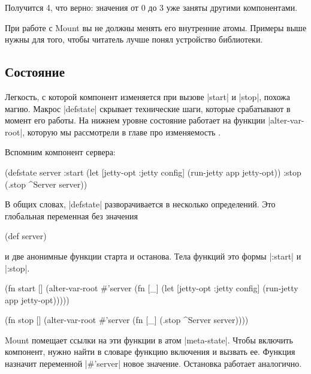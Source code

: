 Получится 4, что верно: значения от 0 до 3 уже заняты другими компонентами.

При работе с Mount вы не должны менять его внутренние атомы. Примеры
выше нужны для того, чтобы читатель лучше понял устройство библиотеки.

\subsection{Состояние}

Легкость, с которой компонент изменяется при вызове \spverb|start| и
\spverb|stop|, похожа магию. Макрос \spverb|defstate| скрывает технические шаги,
которые срабатывают в момент его работы. На нижнем уровне состояние работает на
функции \spverb|alter-var-root|, которую мы рассмотрели в главе про
изменяемость .

Вспомним компонент сервера:

\begin{english}
  \begin{clojure}
(defstate server
  :start (let [{jetty-opt :jetty} config]
           (run-jetty app jetty-opt))
  :stop (.stop ^Server server))
  \end{clojure}
\end{english}

В общих словах, \spverb|defstate| разворачивается в несколько определений. Это
глобальная переменная без значения

\begin{english}
  \begin{clojure}
(def server)
  \end{clojure}
\end{english}

\noindent
и две анонимные функции старта и останова. Тела функций это формы
\spverb|:start| и \spverb|:stop|.

\begin{english}
  \begin{clojure}
(fn start []
  (alter-var-root #'server
   (fn [_]
     (let [{jetty-opt :jetty} config]
       (run-jetty app jetty-opt)))))

(fn stop []
  (alter-var-root #'server
   (fn [_]
     (.stop ^Server server))))
  \end{clojure}
\end{english}

Mount помещает ссылки на эти функции в атом \spverb|meta-state|. Чтобы
включить компонент, нужно найти в словаре функцию включения и вызвать
ее. Функция назначит переменной \spverb|#'server| новое значение. Остановка
работает аналогично.

